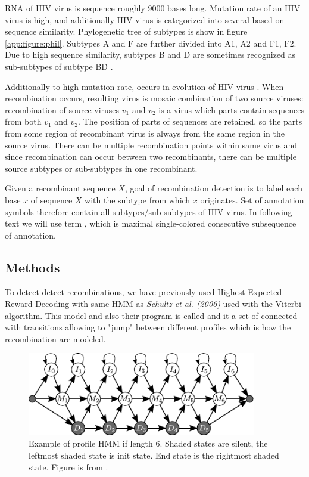 RNA of HIV virus is sequence roughly $9000$ bases long. Mutation rate of an HIV
virus is high\cite{}, and additionally HIV virus is categorized into several
\cite{} based on sequence similarity. Phylogenetic tree of
subtypes is show in figure \ref{app:figure:phil}.  Subtypes A and F are further
divided into  A1, A2 and F1, F2.  Due to high sequence
similarity, subtypes B and D are sometimes recognized as sub-subtypes of subtype
BD \cite{}.

Additionally to high mutation rate,  occurs in
evolution of HIV virus \cite{}. When recombination occurs, resulting virus is
mosaic combination of two source viruses: recombination of source viruses $v_1$
and $v_2$ is a virus which parts contain sequences from both $v_1$ and $v_2$.  The
position of parts of sequences are retained, so the parts from some region of
recombinant virus is always from the same region in the source virus.
There can be multiple recombination points within same virus and since
recombination can occur between two recombinants, there can be multiple source
subtypes or sub-subtypes in one recombinant. 

Given a recombinant sequence $X$, goal of recombination detection is to label
each base $x$ of sequence $X$ with the subtype from which $x$ originates.  Set
of annotation symbols therefore contain all subtypes/sub-subtypes of HIV virus.
In following text we will use term , which is maximal
single-colored consecutive subsequence of annotation.

\subsection{Methods}
\label{HERD:METHODS}
To detect detect recombinations, we have previously used Highest Expected Reward
Decoding \cite{Nanasi2010mgr, Nanasi2010} with same HMM as {\it Schultz et al.
(2006)}\nocite{Schultz2006} used with the Viterbi algorithm. This model and also
their program is called  and it a set of
\cite{Durbin1998}
connected with transitions allowing to "jump" between different profiles which
is how the recombination are modeled.

\begin{figure}
\begin{center}
\includegraphics[width=10cm]{../figures/profile_hmm}
\end{center}
\caption[Profile HMM]{Example of profile HMM if length $6$. Shaded states are
silent, the leftmost shaded state is init state. End state is the rightmost
shaded state. Figure is from \cite{Nanasi2010mgr}.}\label{FIGURE:PROFILEHMM}
\end{figure}

